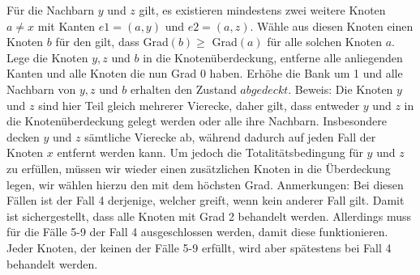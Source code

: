 \documentclass[12pt,onecolumn, notitlepage]{scrartcl}
\begin{document}
Für die Nachbarn $y$ und $z$ gilt, es existieren mindestens zwei weitere Knoten $a \neq x$ mit Kanten $e1 = (a,y)$ und $e2 = (a,z)$. Wähle aus diesen Knoten einen Knoten $b$ für den gilt, dass Grad$(b) \geq $ Grad$(a)$ für alle solchen Knoten $a$. Lege die Knoten $y,z$ und $b$ in die Knotenüberdeckung, entferne alle anliegenden Kanten und alle Knoten die nun Grad $0$ haben. Erhöhe die Bank um 1 und alle Nachbarn von $y,z$ und $b$ erhalten den Zustand $abgedeckt$.  \newline
Beweis: Die Knoten $y$ und $z$ sind hier Teil gleich mehrerer Vierecke, daher gilt, dass entweder $y$ und $z$ in die Knotenüberdeckung gelegt werden oder alle ihre Nachbarn. Insbesondere decken $y$ und $z$ sämtliche Vierecke ab, während dadurch auf jeden Fall der Knoten $x$ entfernt werden kann. Um jedoch die Totalitätsbedingung für $y$ und $z$ zu erfüllen, müssen wir wieder einen zusätzlichen Knoten in die Überdeckung legen, wir wählen hierzu den mit dem höchsten Grad. \newline\newline
Anmerkungen:\newline
Bei diesen Fällen ist der Fall 4 derjenige, welcher greift, wenn kein anderer Fall gilt. Damit ist sichergestellt, dass alle Knoten mit Grad 2 behandelt werden. Allerdings muss für die Fälle 5-9 der Fall 4 ausgeschlossen werden, damit diese funktionieren. Jeder Knoten, der keinen der Fälle 5-9 erfüllt, wird aber spätestens bei Fall 4 behandelt werden.
\end{document}

